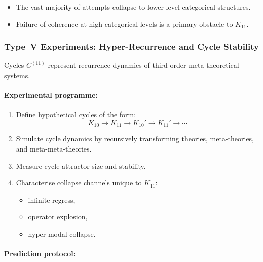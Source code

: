 \begin{itemize}
    \item The vast majority of attempts collapse to
          lower-level categorical structures.
    \item Failure of coherence at high categorical levels is a
          primary obstacle to $K_{11}$.
\end{itemize}



\subsubsection{Type~V Experiments: Hyper-Recurrence and Cycle Stability}

Cycles $C^{(11)}$ represent recurrence dynamics of third-order
meta-theoretical systems.

\paragraph{Experimental programme:}

\begin{enumerate}
    \item Define hypothetical cycles of the form:
          \[
              K_{10}
                \longrightarrow
              K_{11}
                \longrightarrow
              K_{10}'
                \longrightarrow
              K_{11}'
                \longrightarrow \cdots
          \]
    \item Simulate cycle dynamics by recursively transforming
          theories, meta-theories, and meta-meta-theories.
    \item Measure cycle attractor size and stability.
    \item Characterise collapse channels unique to $K_{11}$:
          \begin{itemize}
              \item infinite regress,
              \item operator explosion,
              \item hyper-modal collapse.
          \end{itemize}
\end{enumerate}

\paragraph{Prediction protocol:}

